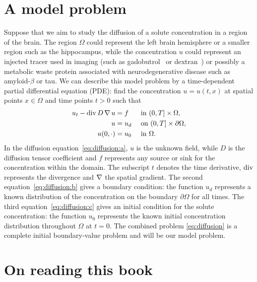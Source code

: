 \section{A model problem}

Suppose that we aim to study the diffusion of a solute concentration
in a region of the brain. The region $\Omega$ could represent the left
brain hemisphere or a smaller region such as the hippocampus, while
the concentration $u$ could represent an injected tracer used in
imaging (such as gadobutrol~\cite{ringstad2018brain} or
dextran~\cite{iliff2013cerebral}) or possibly a metabolic waste
protein associated with neurodegenerative disease such as
amyloid-$\beta$ or tau. We can describe this model problem by a
time-dependent partial differential equation (PDE): find the
concentration $u = u(t, x)$ at spatial points $x \in \Omega$ and time
points $t > 0$ such that
\begin{subequations}
  \label{eq:diffusion}
  \begin{align}
    \label{eq:diffusion:a}
    u_t - \operatorname{\mathrm{div}} D \operatorname{\nabla} u &= f &&\text{ in } (0, T] \times \Omega, \\
    \label{eq:diffusion:b}
    u &= u_d && \text{ on } (0, T] \times \partial \Omega, \\
    \label{eq:diffusion:c}
    u(0, \cdot) &= u_0 && \text{ in } \Omega.
  \end{align}
\end{subequations}
In the diffusion equation~\eqref{eq:diffusion:a}, $u$ is the unknown
field, while $D$ is the diffusion tensor coefficient and $f$
represents any source or sink for the concentration within the
domain. The subscript $t$ denotes the time derivative, $\operatorname{\mathrm{div}}$
represents the divergence and $\operatorname{\nabla}$ the spatial gradient. The second
equation~\eqref{eq:diffusion:b} gives a boundary condition: the
function $u_d$ represents a known distribution of the concentration on
the boundary $\partial \Omega$ for all times. The third
equation~\eqref{eq:diffusion:c} gives an initial condition for the
solute concentration: the function $u_0$ represents the known initial
concentration distribution throughout $\Omega$ at $t=0$. The combined
problem \eqref{eq:diffusion} is a complete initial boundary-value
problem and will be our model problem.

\section{On reading this book}

